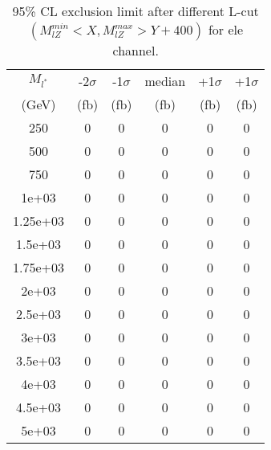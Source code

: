 \documentclass[]{article}
\begin{document}
\begin{table}
\begin{center}
\begin{tabular}{cccccc}
\hline 
\hline 
$M_{l^*}$ & -2$\sigma$ & -1$\sigma$ & median & +1$\sigma$ & +1$\sigma$\\ 
(GeV) & (fb) & (fb) & (fb) & (fb) & (fb)  \\ 
\hline 
\hline 
250 & 0 & 0 & 0 & 0 & 0\\
500 & 0 & 0 & 0 & 0 & 0\\
750 & 0 & 0 & 0 & 0 & 0\\
1e+03 & 0 & 0 & 0 & 0 & 0\\
1.25e+03 & 0 & 0 & 0 & 0 & 0\\
1.5e+03 & 0 & 0 & 0 & 0 & 0\\
1.75e+03 & 0 & 0 & 0 & 0 & 0\\
2e+03 & 0 & 0 & 0 & 0 & 0\\
2.5e+03 & 0 & 0 & 0 & 0 & 0\\
3e+03 & 0 & 0 & 0 & 0 & 0\\
3.5e+03 & 0 & 0 & 0 & 0 & 0\\
4e+03 & 0 & 0 & 0 & 0 & 0\\
4.5e+03 & 0 & 0 & 0 & 0 & 0\\
5e+03 & 0 & 0 & 0 & 0 & 0\\
\hline 
\end{tabular}
\caption{95\% CL exclusion limit after different L-cut $(M_{lZ}^{min} < X, M_{lZ}^{max} > Y + 400)$ for ele channel.}
\label{tab:limit_electron}
\end{center}
\end{table}
\end{document}

